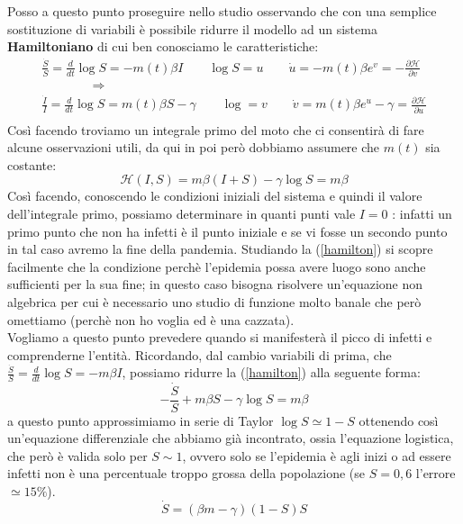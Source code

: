 Posso a questo punto proseguire nello studio osservando che con una semplice sostituzione di variabili è possibile ridurre il modello ad un sistema \textbf{Hamiltoniano} di cui ben conosciamo le caratteristiche:
\begin{equation*}
	\begin{gathered}
		\frac{\dot{S}}{S}=\frac{d}{dt} \log S =-m(t)\beta I\qquad\log S=u\qquad \dot{u}=-m(t)\beta e^{v}=-\frac{\partial\mathcal{H}}{\partial v}\\
			\qquad\qquad\Rightarrow\qquad\\
			\frac{\dot{I}}{I}=\frac{d}{dt}  \log S =m(t)\beta S-\gamma\qquad\log =v\qquad\dot{v}=m(t)\beta e^{u}-\gamma=\frac{\partial\mathcal{H}}{\partial u}\\
	\end{gathered}
\end{equation*}
Così facendo troviamo un integrale primo del moto che ci consentirà di fare alcune osservazioni utili, da qui in poi però dobbiamo assumere che $m(t)$ sia costante:
\begin{equation}
	\mathcal{H}(I,S)=m\beta(I+S)-\gamma\log S=m\beta \label{hamilton}
\end{equation}
Così facendo, conoscendo le condizioni iniziali del sistema e quindi il valore dell'integrale primo, possiamo determinare in quanti punti vale $I=0$ : infatti un primo punto che non ha infetti è il punto iniziale e se vi fosse un secondo punto in tal caso avremo la fine della pandemia. Studiando la  (\ref{hamilton}) si scopre facilmente che la condizione perchè l'epidemia possa avere luogo sono anche sufficienti per la sua fine; in questo caso bisogna risolvere un'equazione non algebrica per cui è necessario uno studio di funzione molto banale che però omettiamo (perchè non ho voglia ed è una cazzata).\\

Vogliamo a questo punto prevedere quando si manifesterà il picco di infetti e comprenderne l'entità. Ricordando, dal cambio variabili di prima, che $\frac{\dot{S}}{S}=\frac{d}{dt} \log S =-m\beta I$, possiamo ridurre la (\ref{hamilton}) alla seguente forma:
\begin{equation*}
	-\frac{\dot{S}}{S} + m\beta S-\gamma\log S=m\beta
\end{equation*}
a questo punto approssimiamo in serie di Taylor $\log S\simeq1-S$ ottenendo così un'equazione differenziale che abbiamo già incontrato, ossia l'equazione logistica, che però è valida solo per $S\sim 1$, ovvero solo se l'epidemia è agli inizi o ad essere infetti non è una percentuale troppo grossa della popolazione (se $S=0,6$ l'errore $\simeq 15\%$).
\begin{equation}
	\dot{S}=(\beta m-\gamma)(1-S)S
\end{equation} 

